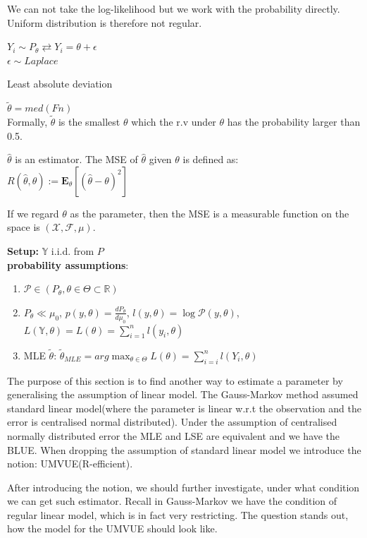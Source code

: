 \begin{example}[Uniform]
	We can not take the log-likelihood but we work with the probability directly.\\
	Uniform distribution is therefore not regular. 
\end{example}

\begin{example}
	$Y_i \sim P_\theta \rightleftarrows Y_i = \theta + \epsilon$\\
	$\epsilon \sim Laplace$
	
	Least absolute deviation
\end{example}

\begin{lemma}
	$\tilde{\theta} = med (Fn)$ \\
	Formally, $\tilde{\theta}$ is the smallest $\theta$ which the r.v under $\theta$ has the probability larger than 0.5.
\end{lemma}


\begin{definition}
\(\hat{\theta} \) is an estimator. The MSE of \( \hat{\theta} \) given \( \theta \) is defined as:
\( R(\hat{\theta}, \theta) := \mathbf{E}_{\theta}[(\hat{\theta} - \theta)^2] \)\par
If we regard $\theta$ as the parameter, then the MSE is a measurable function on the space is \( (\mathcal{X}, \mathcal{F}, \mu) \). 
\end{definition}



\textbf{Setup:} $\mathbb{Y}$ i.i.d. from $P$\\
\textbf{probability assumptions}:
\begin{enumerate}
	\item $\mathcal{P} \in (P_\theta, \theta \in \Theta \subset \mathbb{R})$
	\item $P_\theta \ll \mu_0$, \quad $p(y, \theta) = \frac{dP_\theta}{d\mu_0}$, \quad $l(y, \theta) = \log \mathcal{P}(y, \theta)$, \quad $L(\mathbb{Y}, \theta) = L(\theta) = \sum_{i = 1}^n l(y_i, \theta)$
	\item MLE $\tilde{\theta}$: $\tilde{\theta}_{MLE} = arg \max_{\theta \in \Theta} L(\theta) = \sum_{i = i}^n l(Y_i, \theta)$
\end{enumerate} 


The purpose of this section is to find another way to estimate a parameter by generalising the assumption of linear model. The Gauss-Markov method assumed standard linear model(where the parameter is linear w.r.t the observation and the error is centralised normal distributed). Under the assumption of centralised normally distributed error the MLE and LSE are equivalent and we have the BLUE. When dropping the assumption of standard linear model we introduce the notion: UMVUE(R-efficient).\par 
After introducing the notion, we should further investigate, under what condition we can get such estimator. Recall in Gauss-Markov we have the condition of regular linear model, which is in fact very restricting. The question stands out, how the model for the UMVUE should look like.\par 


